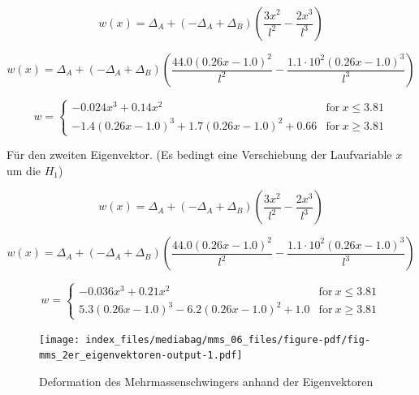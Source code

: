 \documentclass[
  letterpaper,
  DIV=11]{scrreprt}
\begin{document}
\begin{equation}w{\left(x \right)} = \Delta_{A} + \left(- \Delta_{A} + \Delta_{B}\right) \left(\frac{3 x^{2}}{l^{2}} - \frac{2 x^{3}}{l^{3}}\right)\end{equation}

\begin{equation}w{\left(x \right)} = \Delta_{A} + \left(- \Delta_{A} + \Delta_{B}\right) \left(\frac{44.0 \left(0.26 x - 1.0\right)^{2}}{l^{2}} - \frac{1.1 \cdot 10^{2} \left(0.26 x - 1.0\right)^{3}}{l^{3}}\right)\end{equation}

\begin{equation}w = \begin{cases} - 0.024 x^{3} + 0.14 x^{2} & \text{for}\: x \leq 3.81 \\- 1.4 \left(0.26 x - 1.0\right)^{3} + 1.7 \left(0.26 x - 1.0\right)^{2} + 0.66 & \text{for}\: x \geq 3.81 \end{cases}\end{equation}

Für den zweiten Eigenvektor. (Es bedingt eine Verschiebung der
Laufvariable \(x\) um die \(H_1\))

\begin{equation}w{\left(x \right)} = \Delta_{A} + \left(- \Delta_{A} + \Delta_{B}\right) \left(\frac{3 x^{2}}{l^{2}} - \frac{2 x^{3}}{l^{3}}\right)\end{equation}

\begin{equation}w{\left(x \right)} = \Delta_{A} + \left(- \Delta_{A} + \Delta_{B}\right) \left(\frac{44.0 \left(0.26 x - 1.0\right)^{2}}{l^{2}} - \frac{1.1 \cdot 10^{2} \left(0.26 x - 1.0\right)^{3}}{l^{3}}\right)\end{equation}

\begin{equation}w = \begin{cases} - 0.036 x^{3} + 0.21 x^{2} & \text{for}\: x \leq 3.81 \\5.3 \left(0.26 x - 1.0\right)^{3} - 6.2 \left(0.26 x - 1.0\right)^{2} + 1.0 & \text{for}\: x \geq 3.81 \end{cases}\end{equation}

\begin{figure}[H]

{\centering \texttt{[image: index\_files/mediabag/mms\_06\_files/figure-pdf/fig-mms\_2er\_eigenvektoren-output-1.pdf]}

}

\caption{\label{fig-mms_2er_eigenvektoren}Deformation des
Mehrmassenschwingers anhand der Eigenvektoren}

\end{figure}
\end{document}
